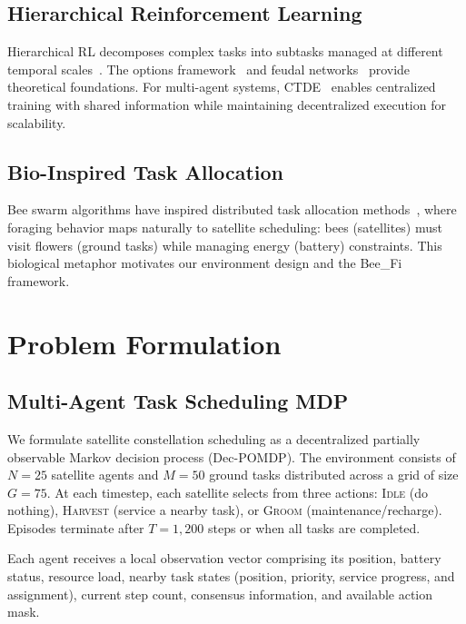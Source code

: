 \documentclass[conference]{IEEEtran}
\begin{document}
\subsection{Hierarchical Reinforcement Learning}
Hierarchical RL decomposes complex tasks into subtasks managed at different temporal scales~\cite{pateria2021hierarchical}. The options framework~\cite{sutton1999between} and feudal networks~\cite{vezhnevets2017feudal} provide theoretical foundations. For multi-agent systems, CTDE~\cite{lowe2017multi} enables centralized training with shared information while maintaining decentralized execution for scalability.

\subsection{Bio-Inspired Task Allocation}
Bee swarm algorithms have inspired distributed task allocation methods~\cite{karaboga2014comprehensive}, where foraging behavior maps naturally to satellite scheduling: bees (satellites) must visit flowers (ground tasks) while managing energy (battery) constraints. This biological metaphor motivates our environment design and the Bee\_Fi framework.


\section{Problem Formulation}
\label{sec:problem}

\subsection{Multi-Agent Task Scheduling MDP}
We formulate satellite constellation scheduling as a decentralized partially observable Markov decision process (Dec-POMDP). The environment consists of $N = 25$ satellite agents and $M = 50$ ground tasks distributed across a grid of size $G = 75$. At each timestep, each satellite selects from three actions: \textsc{Idle} (do nothing), \textsc{Harvest} (service a nearby task), or \textsc{Groom} (maintenance/recharge). Episodes terminate after $T = 1{,}200$ steps or when all tasks are completed.

Each agent receives a local observation vector comprising its position, battery status, resource load, nearby task states (position, priority, service progress, and assignment), current step count, consensus information, and available action mask.
\end{document}
